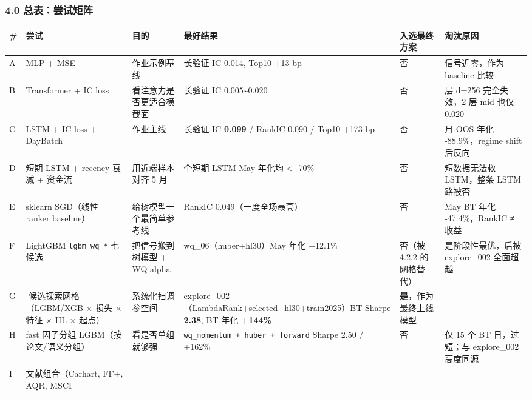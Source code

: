 \documentclass[
  fontset=fandol]{ctexart}
\begin{document}
\hypertarget{ux603bux8868ux5c1dux8bd5ux77e9ux9635}{%
\subsubsection{4.0
总表：尝试矩阵}\label{ux603bux8868ux5c1dux8bd5ux77e9ux9635}}

\begin{longtable}[]{@{}
  >{\raggedright\arraybackslash}p{}
  >{\raggedright\arraybackslash}p{}
  >{\raggedright\arraybackslash}p{}
  >{\raggedright\arraybackslash}p{}
  >{\raggedright\arraybackslash}p{}
  >{\raggedright\arraybackslash}p{}@{}}
\toprule
\# & 尝试 & 目的 & 最好结果 &
入选最终方案 & 淘汰原因 \\
\midrule
\endhead
A & MLP + MSE & 作业示例基线 & 长验证 IC
0.014, Top10 +13 bp & 否 &
信号近零，作为 baseline 比较 \\
B & Transformer + IC loss &
看注意力是否更适合横截面 & 长验证 IC
0.005\textasciitilde0.020 & 否 & 4 层
d=256 完全失效，2 层 mid 也仅 0.020 \\
C & LSTM + IC loss + DayBatch & 作业主线
& 长验证 IC \textbf{0.099} / RankIC
0.090 / Top10 +173 bp & 否 & 5 月 OOS
年化 -88.9\%，regime shift 后反向 \\
D & 短期 LSTM + recency 衰减 + 资金流 &
用近端样本对齐 5 月 & 4 个短期 LSTM May
年化均 \textless{} -70\% & 否 &
短数据无法救 LSTM，整条 LSTM 路被否 \\
E & sklearn SGD（线性 ranker baseline）
& 给树模型一个最简单参考线 & RankIC
0.049（一度全场最高） & 否 & May BT 年化
-47.4\%，RankIC ≠ 收益 \\
F & LightGBM \texttt{lgbm\_wq\_*} 七候选
& 把信号搬到树模型 + WQ alpha &
wq\_06（huber+hl30）May 年化 +12.1\% &
否（被 4.2.2 的网格替代） &
是阶段性最优，后被 explore\_002
全面超越 \\
G & 43-候选探索网格（LGBM/XGB × 损失 ×
特征 × HL × 起点） & 系统化扫调参空间 &
explore\_002（LambdaRank+selected+hl30+train2025）BT
Sharpe \textbf{2.38}, BT 年化
\textbf{+144\%} &
\textbf{是}，作为最终上线模型 & --- \\
H & fast 因子分组
LGBM（按论文/语义分组） &
看是否单组就够强 &
\texttt{wq\_momentum\ +\ huber\ +\ forward}
Sharpe 2.50 / +162\% & 否 & 仅 15 个 BT
日，过短；与 explore\_002 高度同源 \\
I & 文献组合（Carhart, FF+, AQR, MSCI

\end{longtable}
\end{document}
